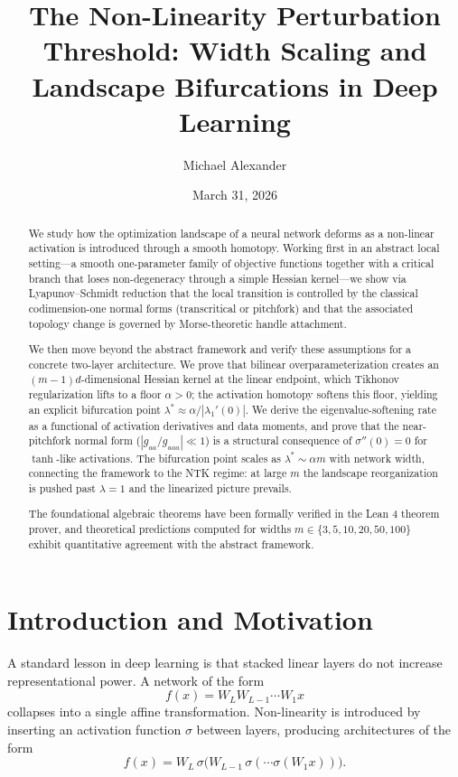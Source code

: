 \documentclass[11pt, reqno]{amsart}
\title[The Non-Linearity Perturbation Threshold]{The Non-Linearity Perturbation Threshold: Width Scaling and Landscape Bifurcations in Deep Learning}
\author{Michael Alexander}
\date{March 31, 2026}
\theoremstyle{plain}
\theoremstyle{definition}
\theoremstyle{remark}
\begin{document}
\begin{abstract}
We study how the optimization landscape of a neural network deforms as a non-linear activation is introduced through a smooth homotopy. Working first in an abstract local setting---a smooth one-parameter family of objective functions together with a critical branch that loses non-degeneracy through a simple Hessian kernel---we show via Lyapunov--Schmidt reduction that the local transition is controlled by the classical codimension-one normal forms (transcritical or pitchfork) and that the associated topology change is governed by Morse-theoretic handle attachment.

We then move beyond the abstract framework and verify these assumptions for a concrete two-layer architecture. We prove that bilinear overparameterization creates an $(m-1)d$-dimensional Hessian kernel at the linear endpoint, which Tikhonov regularization lifts to a floor $\alpha>0$; the activation homotopy softens this floor, yielding an explicit bifurcation point $\lambda^*\approx\alpha/|\lambda_1'(0)|$. We derive the eigenvalue-softening rate as a functional of activation derivatives and data moments, and prove that the near-pitchfork normal form ($|g_{aa}/g_{aaa}|\ll 1$) is a structural consequence of $\sigma''(0)=0$ for $\tanh$-like activations. The bifurcation point scales as $\lambda^*\sim\alpha m$ with network width, connecting the framework to the NTK regime: at large $m$ the landscape reorganization is pushed past $\lambda=1$ and the linearized picture prevails. 

The foundational algebraic theorems have been formally verified in the Lean 4 theorem prover, and theoretical predictions computed for widths $m \in \{3, 5, 10, 20, 50, 100\}$ exhibit quantitative agreement with the abstract framework.
\end{abstract}
\maketitle

\section{Introduction and Motivation}

A standard lesson in deep learning is that stacked linear layers do not increase representational power. A network of the form
\begin{equation}
  f(x)=W_LW_{L-1}\cdots W_1x
\end{equation}
collapses into a single affine transformation. Non-linearity is introduced by inserting an activation function $\sigma$ between layers, producing architectures of the form
\begin{equation}
  f(x)=W_L\,\sigma\!\bigl(W_{L-1}\,\sigma(\cdots \sigma(W_1x))\bigr).
\end{equation}
\end{document}
